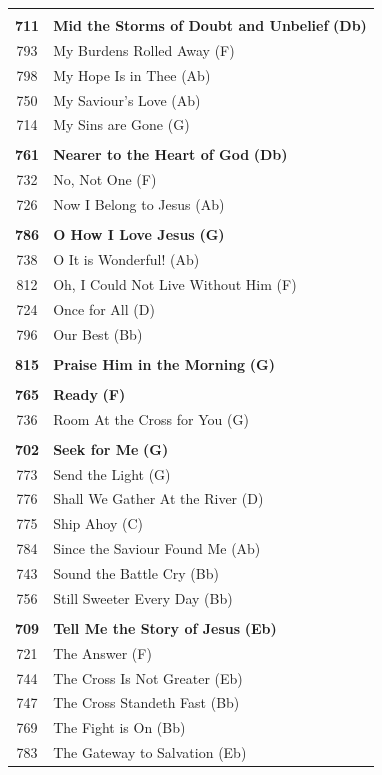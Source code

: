 \begin{supertabular}{c l}
 & \\
\textbf{711} & \textbf{Mid the Storms of Doubt and Unbelief} \textbf{(Db)} \\
793 & My Burdens Rolled Away (F) \\
798 & My Hope Is in Thee (Ab) \\
750 & My Saviour’s Love (Ab) \\
714 & My Sins are Gone (G) \\
 & \\
\textbf{761} & \textbf{Nearer to the Heart of God} \textbf{(Db)} \\
732 & No, Not One (F) \\
726 & Now I Belong to Jesus (Ab) \\
 & \\
\textbf{786} & \textbf{O How I Love Jesus} \textbf{(G)} \\
738 & O It is Wonderful! (Ab) \\
812 & Oh, I Could Not Live Without Him (F) \\
724 & Once for All (D) \\
796 & Our Best (Bb) \\
 & \\
\textbf{815} & \textbf{Praise Him in the Morning} \textbf{(G)} \\
 & \\
\textbf{765} & \textbf{Ready} \textbf{(F)} \\
736 & Room At the Cross for You (G) \\
 & \\
\textbf{702} & \textbf{Seek for Me} \textbf{(G)} \\
773 & Send the Light (G) \\
776 & Shall We Gather At the River (D) \\
775 & Ship Ahoy (C) \\
784 & Since the Saviour Found Me (Ab) \\
743 & Sound the Battle Cry (Bb) \\
756 & Still Sweeter Every Day (Bb) \\
 & \\
\textbf{709} & \textbf{Tell Me the Story of Jesus} \textbf{(Eb)} \\
721 & The Answer (F) \\
744 & The Cross Is Not Greater (Eb) \\
747 & The Cross Standeth Fast (Bb) \\
769 & The Fight is On (Bb) \\
783 & The Gateway to Salvation (Eb) \\

\end{supertabular}
